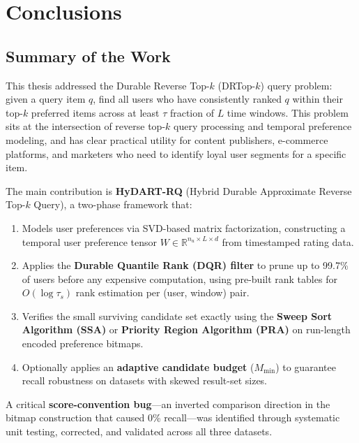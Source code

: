 \chapter{Conclusions}
\label{ch:conclusions}

\section{Summary of the Work}

This thesis addressed the Durable Reverse Top-$k$ (DRTop-$k$) query problem: given a query item $q$, find all users who have consistently ranked $q$ within their top-$k$ preferred items across at least $\tau$ fraction of $L$ time windows. This problem sits at the intersection of reverse top-$k$ query processing and temporal preference modeling, and has clear practical utility for content publishers, e-commerce platforms, and marketers who need to identify loyal user segments for a specific item.

The main contribution is \textbf{HyDART-RQ} (Hybrid Durable Approximate Reverse Top-$k$ Query), a two-phase framework that:
\begin{enumerate}
  \item Models user preferences via SVD-based matrix factorization, constructing a temporal user preference tensor $W \in \mathbb{R}^{n_u \times L \times d}$ from timestamped rating data.
  \item Applies the \textbf{Durable Quantile Rank (DQR) filter} to prune up to 99.7\% of users before any expensive computation, using pre-built rank tables for $O(\log \tau_s)$ rank estimation per (user, window) pair.
  \item Verifies the small surviving candidate set exactly using the \textbf{Sweep Sort Algorithm (SSA)} or \textbf{Priority Region Algorithm (PRA)} on run-length encoded preference bitmaps.
  \item Optionally applies an \textbf{adaptive candidate budget} ($M_{\min}$) to guarantee recall robustness on datasets with skewed result-set sizes.
\end{enumerate}

A critical \textbf{score-convention bug}---an inverted comparison direction in the bitmap construction that caused 0\% recall---was identified through systematic unit testing, corrected, and validated across all three datasets.

